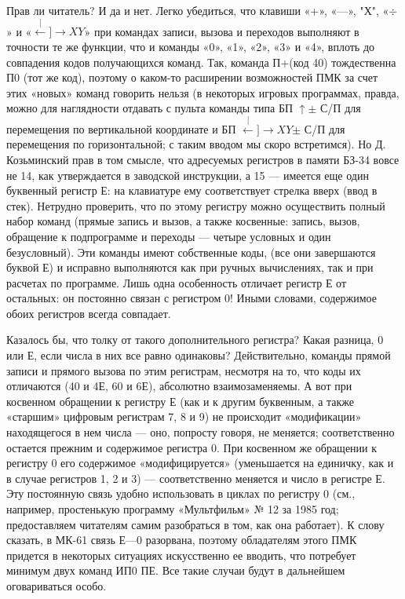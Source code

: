 \documentclass[11pt,a4paper,oneside]{article}
\def\XY{$\stackrel[\leftarrow]{\rightarrow}{XY}$}
\begin{document}
Прав ли читатель? И да и нет. Легко убедиться, что клавиши «+»,	«—», "Х", «$\div$» и «\XY» при командах записи, вызова и переходов выполняют в точности те же функции, что и команды «0», «1», «2», «3» и «4», вплоть до совпадения кодов получающихся команд. Так, команда П+(код 40) тождественна П0 (тот же код), поэтому о каком-то расширении возможностей ПМК за счет этих «новых» команд говорить нельзя (в некоторых игровых программах, правда, можно для наглядности отдавать с пульта команды типа БП $\uparrow \pm$ С/П для перемещения по вертикальной координате и БП \XY $\pm$ С/П для перемещения по горизонтальной; с таким вводом мы скоро встретимся). Но Д. Козьминский прав в том смысле, что адресуемых регистров в памяти БЗ-34 вовсе не 14, как утверждается в заводской инструкции, а 15 — имеется еще один буквенный регистр Е: на клавиатуре ему соответствует стрелка вверх (ввод в стек). Нетрудно проверить, что по этому регистру можно осуществить полный набор команд (прямые запись и вызов, а также косвенные: запись, вызов, обращение к подпрограмме и переходы — четыре условных и один безусловный). Эти команды имеют собственные коды, (все они завершаются буквой Е) и исправно выполняются как при ручных вычислениях, так и при расчетах по программе. Лишь одна особенность отличает регистр Е от остальных: он постоянно связан с регистром 0! Иными словами, содержимое обоих регистров всегда совпадает.

Казалось бы, что толку от такого дополнительного регистра? Какая разница, 0 или Е, если числа в них все равно одинаковы? Действительно, команды прямой записи и прямого вызова по этим регистрам, несмотря на то, что коды их отличаются (40 и 4Е, 60 и 6Е), абсолютно взаимозаменяемы. А вот при косвенном обращении к регистру Е (как и к другим буквенным, а также «старшим» цифровым регистрам 7, 8 и 9) не происходит «модификации» находящегося в нем числа — оно, попросту говоря, не меняется; соответственно остается прежним и содержимое регистра 0. При косвенном же обращении к регистру 0 его содержимое «модифицируется» (уменьшается на единичку, как и в случае регистров 1, 2 и 3) — соответственно меняется и число в регистре Е. Эту постоянную связь удобно использовать в циклах по регистру 0 (см., например, простенькую программу «Мультфильм» № 12 за 1985 год; предоставляем читателям самим разобраться в том, как она работает). К слову сказать, в МК-61 связь Е—0 разорвана, поэтому обладателям этого ПМК придется в некоторых ситуациях искусственно ее вводить, что потребует минимум двух команд ИП0 ПЕ. Все такие случаи будут в дальнейшем оговариваться особо.
\end{document}
